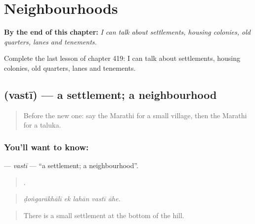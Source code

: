 
\chapter{Neighbourhoods}
\label{ch:mr-neighbourhoods}

\begin{chapteropening}
\textbf{By the end of this chapter:} \emph{I can talk about settlements, housing colonies, old quarters, lanes and tenements.}

Complete the last lesson of chapter 419: I can talk about settlements, housing colonies, old quarters, lanes and tenements.
\end{chapteropening}

\section[\texorpdfstring{\mr{वस्ती} (vastī)}{वस्ती (vastī)}]{ (vastī) — a settlement; a neighbourhood}

\label{lesson:MR-C419-vasti}



\begin{quote}
Before the new one: say the Marathi for a small village, then the Marathi for a taluka.
\end{quote}

\subsection*{You'll want to know: }
\textbf{} — \emph{vastī} — \textquotedblleft{}a settlement; a neighbourhood\textquotedblright{}.

\begin{quote}
    .
\end{quote}

\begin{quote}
\emph{ḍoṅgarākhālī ek lahān vastī āhe.}
\end{quote}

\begin{quote}
There is a small settlement at the bottom of the hill.
\end{quote}

